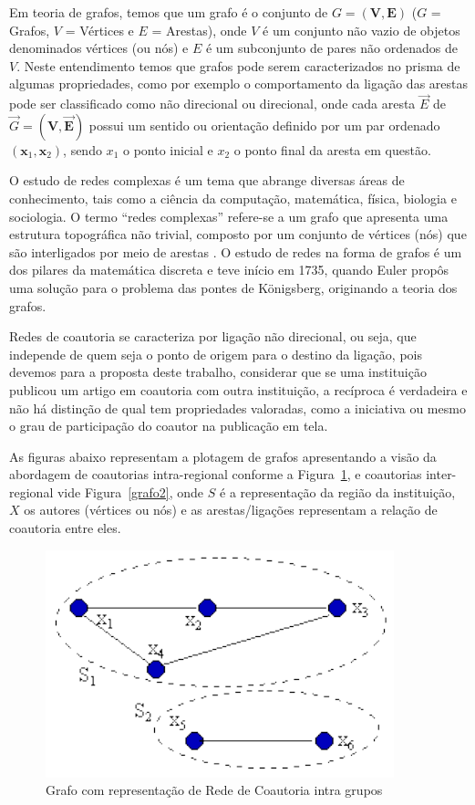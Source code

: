 \documentclass[12pt]{article}
\begin{document}
Em teoria de grafos, temos que um grafo é o conjunto de $G = (\bm V,\bm E)$ ($G$ = Grafos, $V$ = Vértices e $E$ = Arestas), onde $V$ é um conjunto não vazio de objetos denominados vértices (ou nós) e $E$ é um subconjunto de pares não ordenados de $V$. Neste entendimento temos que grafos pode serem caracterizados no prisma de algumas propriedades, como por exemplo o comportamento da ligação das arestas pode ser classificado como não direcional ou direcional, onde cada aresta $\Vec E$ de $\Vec G = (\bm V,\bm \Vec E)$ possui um sentido ou orientação definido por um par ordenado $(\bm x_{1}, \bm x_{2})$, sendo $x_{1}$ o ponto inicial e $x_{2}$ o ponto final da aresta em questão.

O estudo de redes complexas é um tema  que abrange diversas áreas de conhecimento, tais como a ciência da computação, matemática, física, biologia e sociologia. 
O termo ``redes complexas'' refere-se a um grafo que apresenta uma estrutura topográfica não trivial, composto por um conjunto de vértices (nós) que são interligados por meio de arestas \cite{barabasi2003everything}. 
O estudo de redes na forma de grafos é um dos pilares da matemática discreta e teve início em 1735, quando Euler propôs uma solução para o problema das pontes de Königsberg, originando a teoria dos grafos.

Redes de coautoria se caracteriza por ligação não direcional, ou seja, que independe de quem seja o ponto de origem para o destino da ligação, pois devemos para a proposta deste trabalho, considerar que se uma instituição publicou um artigo em coautoria com outra instituição, a recíproca é verdadeira e não há distinção de qual tem propriedades valoradas, como a iniciativa ou mesmo o grau de participação do coautor na publicação em tela.

As figuras abaixo representam a plotagem de grafos apresentando a visão da abordagem de coautorias intra-regional conforme a Figura~\ref{grafo1}, e coautorias inter-regional vide Figura~\ref{grafo2}, onde $S$ é a representação da região da instituição, $X$ os autores (vértices ou nós) e as arestas/ligações representam a relação de coautoria entre eles.


\begin{figure}[H]
\centering
\includegraphics[scale=0.8]{images/intra-grafo.pdf}
\caption{Grafo com representação de Rede de Coautoria intra grupos}
\label{grafo1}
\end{figure}
\end{document}
